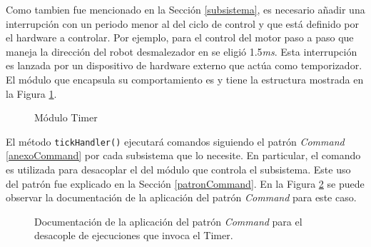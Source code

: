 
Como tambien fue mencionado en la Sección \ref{subsistema}, es necesario añadir una interrupción con un periodo menor al del ciclo de control y que está definido por el hardware a controlar. Por ejemplo, para el control del motor paso a paso que maneja la dirección del robot desmalezador en \cite{paperPomponio} se eligió 1.5\textit{ms}. Esta interrupción es lanzada por un dispositivo de hardware externo que actúa como temporizador. El módulo que encapsula su comportamiento es \Timer y tiene la estructura mostrada en la Figura \ref{moduloTimer}.

\begin{figure}[H]
\caption{Módulo Timer}
\label{moduloTimer}
\begin{center}
\end{center}
\end{figure}

El método \verb|tickHandler()| ejecutará comandos siguiendo el patrón \textit{Command} \ref{anexoCommand} por cada subsistema que lo necesite. En particular, el comando es utilizada para desacoplar el \Timer del módulo que controla el subsistema. Este uso del patrón fue explicado en la Sección \ref{patronCommand}. En la Figura \ref{docCommandTimer} se puede observar la documentación de la aplicación del patrón \textit{Command} para este caso.

\begin{figure}[H]
\caption{Documentación de la aplicación del patrón \textit{Command} para el desacople de ejecuciones que invoca el Timer.}
\label{docCommandTimer}
\end{figure}



